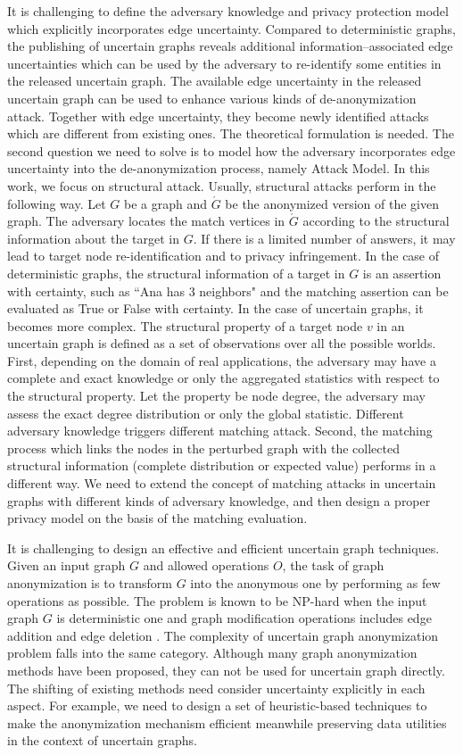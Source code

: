 It is challenging to define the adversary knowledge and privacy protection model which explicitly incorporates edge uncertainty. Compared to deterministic graphs, the publishing of uncertain graphs reveals additional information--associated edge uncertainties which can be used by the adversary to re-identify some entities in the released uncertain graph. The available edge uncertainty in the released uncertain graph can be used to enhance various kinds of de-anonymization attack. Together with edge uncertainty, they become newly identified attacks which are different from existing ones. The theoretical formulation is needed. The second question we need to solve is to model how the adversary incorporates edge uncertainty into the de-anonymization process, namely Attack Model. In this work, we focus on structural attack. Usually, structural attacks perform in the following way. Let $G$ be a graph and $\acute{G}$ be the anonymized version of the given graph. The adversary locates the match vertices in $\acute{G}$ according to the structural information about the target in $G$. If there is a limited number of answers, it may lead to target node re-identification and to privacy infringement. In the case of deterministic graphs, the structural information of a target in $G$ is an assertion with certainty, such as ``Ana has 3 neighbors" and the matching assertion can be evaluated as True or False with certainty. In the case of uncertain graphs, it becomes more complex. The structural property of a target node $v$ in an uncertain graph is defined as a set of observations over all the possible worlds. First, depending on the domain of real applications, the adversary may have a complete and exact knowledge or only the aggregated statistics with respect to the structural property. Let the property be node degree, the adversary may assess the exact degree distribution or only the global statistic. Different adversary knowledge triggers different matching attack. Second, the matching process which links the nodes in the perturbed graph with the collected structural information (complete distribution or expected value) performs in a different way. We need to extend the concept of matching attacks in uncertain graphs with different kinds of adversary knowledge, and then design a proper privacy model on the basis of the matching evaluation. 

It is challenging to design an effective and efficient uncertain graph techniques. Given an input graph $G$ and allowed operations $O$, the task of graph anonymization is to transform $G$ into the anonymous one by performing as few operations as possible.  The problem is known to be NP-hard when the input graph $G$ is deterministic one and graph modification operations includes edge addition and edge deletion \cite{Hartung_Theory_2015}. The complexity of uncertain graph anonymization problem falls into the same category. Although many graph anonymization methods have been proposed, they can not be used for uncertain graph directly. The shifting of existing methods need consider uncertainty explicitly in each aspect. For example, we need to design a set of heuristic-based techniques to make the anonymization mechanism efficient meanwhile preserving data utilities in the context of uncertain graphs. 
